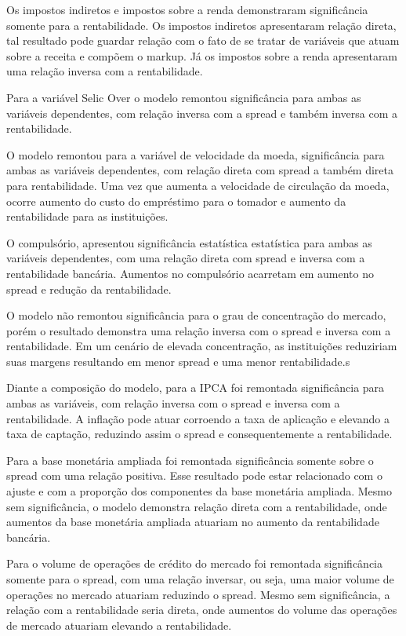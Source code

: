 \documentclass[
  12pt,
  12pt,
  openright,
  oneside,
  a4paper,
  chapter=TITLE,
  section=TITLE,
  subsection=TITLE,
  subsubsection=TITLE,
  english,
  portugues,
  sumario=tradicional]{abntex2}
\begin{document}
Os impostos indiretos e impostos sobre a renda demonstraram significância somente para a rentabilidade. Os impostos indiretos apresentaram relação direta, tal resultado pode guardar relação com o fato de se tratar de variáveis que atuam sobre a receita e compõem o markup. Já os impostos sobre a renda apresentaram uma relação inversa com a rentabilidade.

Para a variável Selic Over o modelo remontou significância para ambas as variáveis dependentes, com relação inversa com a spread e também inversa com a rentabilidade.

O modelo remontou para a variável de velocidade da moeda, significância para ambas as variáveis dependentes, com relação direta com spread a também direta para rentabilidade. Uma vez que aumenta a velocidade de circulação da moeda, ocorre aumento do custo do empréstimo para o tomador e aumento da rentabilidade para as instituições.

O compulsório, apresentou significância estatística estatística para ambas as variáveis dependentes, com uma relação direta com spread e inversa com a rentabilidade bancária. Aumentos no compulsório acarretam em aumento no spread e redução da rentabilidade.

O modelo não remontou significância para o grau de concentração do mercado, porém o resultado demonstra uma relação inversa com o spread e inversa com a rentabilidade. Em um cenário de elevada concentração, as instituições reduziriam suas margens resultando em menor spread e uma menor rentabilidade.s

Diante a composição do modelo, para a IPCA foi remontada significância para ambas as variáveis, com relação inversa com o spread e inversa com a rentabilidade. A inflação pode atuar corroendo a taxa de aplicação e elevando a taxa de captação, reduzindo assim o spread e consequentemente a rentabilidade.

Para a base monetária ampliada foi remontada significância somente sobre o spread com uma relação positiva. Esse resultado pode estar relacionado com o ajuste e com a proporção dos componentes da base monetária ampliada. Mesmo sem significância, o modelo demonstra relação direta com a rentabilidade, onde aumentos da base monetária ampliada atuariam no aumento da rentabilidade bancária.

Para o volume de operações de crédito do mercado foi remontada significância somente para o spread, com uma relação inversar, ou seja, uma maior volume de operações no mercado atuariam reduzindo o spread. Mesmo sem significância, a relação com a rentabilidade seria direta, onde aumentos do volume das operações de mercado atuariam elevando a rentabilidade.
\end{document}
